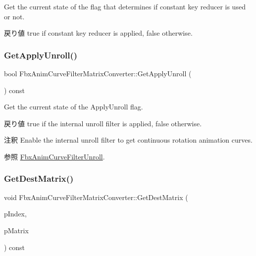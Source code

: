 Get the current state of the flag that determines if constant key reducer is used or not. \begin{DoxyReturn}{戻り値}
{\ttfamily true} if constant key reducer is applied, {\ttfamily false} otherwise. 
\end{DoxyReturn}
\mbox{\label{class_fbx_anim_curve_filter_matrix_converter_acf269bdba7f9526a1c957505cb3beb9c}} 
\subsubsection{\texorpdfstring{Get\+Apply\+Unroll()}{GetApplyUnroll()}}
{\footnotesize\ttfamily bool Fbx\+Anim\+Curve\+Filter\+Matrix\+Converter\+::\+Get\+Apply\+Unroll (\begin{DoxyParamCaption}{ }\end{DoxyParamCaption}) const}

Get the current state of the Apply\+Unroll flag. \begin{DoxyReturn}{戻り値}
{\ttfamily true} if the internal unroll filter is applied, {\ttfamily false} otherwise. 
\end{DoxyReturn}
\begin{DoxyRemark}{注釈}
Enable the internal unroll filter to get continuous rotation animation curves. 
\end{DoxyRemark}
\begin{DoxySeeAlso}{参照}
\hyperlink{class_fbx_anim_curve_filter_unroll}{Fbx\+Anim\+Curve\+Filter\+Unroll}. 
\end{DoxySeeAlso}
\mbox{\label{class_fbx_anim_curve_filter_matrix_converter_a5cd3e587cb299a3ae2d78e9c964a5ef0}} 
\subsubsection{\texorpdfstring{Get\+Dest\+Matrix()}{GetDestMatrix()}}
{\footnotesize\ttfamily void Fbx\+Anim\+Curve\+Filter\+Matrix\+Converter\+::\+Get\+Dest\+Matrix (\begin{DoxyParamCaption}\item[{\hyperlink{class_fbx_anim_curve_filter_matrix_converter_a41638d5acd6d14ef0f095ab75b18ee69}{E\+Matrix\+Index}}]{p\+Index,  }\item[{\hyperlink{class_fbx_a_matrix}{Fbx\+A\+Matrix} \&}]{p\+Matrix }\end{DoxyParamCaption}) const}

